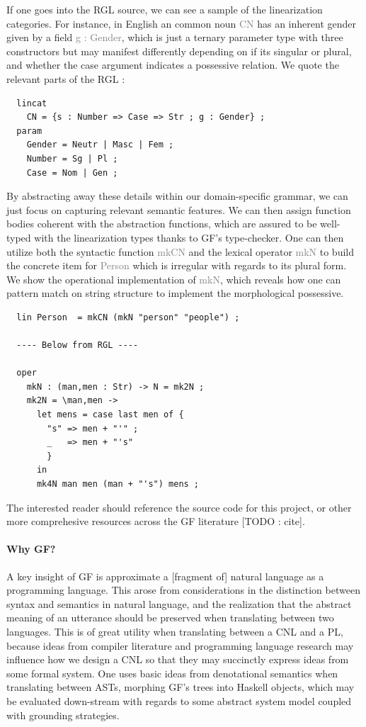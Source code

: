 \documentclass[a4paper, 11pt]{article}
\newcommand{\gray}[1]{\textcolor{gray}{#1}}
\begin{document}
If one goes into the RGL source, we can see a sample of the linearization
categories. For instance, in English an common noun \gray{CN} has an inherent
gender given by a field \gray{g : Gender}, which is just a ternary parameter
type with three constructors but may manifest differently
depending on if its singular or plural, and whether the case argument indicates
a possessive relation. We quote the relevant parts of the RGL :

\begin{verbatim}
  lincat
    CN = {s : Number => Case => Str ; g : Gender} ;
  param    
    Gender = Neutr | Masc | Fem ;
    Number = Sg | Pl ;
    Case = Nom | Gen ;
\end{verbatim}

By abstracting away these details within our domain-specific grammar, we can
just focus on capturing relevant semantic features. We can then assign function
bodies coherent with the abstraction functions, which are assured to be
well-typed with the linearization types thanks to GF's type-checker. One can
then utilize both the syntactic function \gray{mkCN} and the lexical operator
\gray{mkN} to build the concrete item for \gray{Person} which is irregular with regards
to its plural form. We show the operational implementation of \gray{mkN}, which
reveals how one can pattern match on string structure to implement the
morphological possessive.

\begin{verbatim}
  lin Person  = mkCN (mkN "person" "people") ;

  ---- Below from RGL ----

  oper
    mkN : (man,men : Str) -> N = mk2N ;
    mk2N = \man,men ->
      let mens = case last men of {
        "s" => men + "'" ;
        _   => men + "'s"
        }
      in
      mk4N man men (man + "'s") mens ;
\end{verbatim}

The interested reader should reference the source code for this project, or
other more comprehesive resources across the GF literature [TODO : cite].

\paragraph{Why GF?}

A key insight of GF is approximate a [fragment of] natural language as a
programming language. This arose from considerations in the distinction between
syntax and semantics in natural language, and the realization that the abstract
meaning of an utterance should be preserved when translating between two
languages. This is of great utility when translating between a CNL and a PL,
because ideas from compiler literature and programming language research may
influence how we design a CNL so that they may succinctly express ideas from
some formal system. One uses basic ideas from denotational semantics when
translating between ASTs, morphing GF's trees into Haskell objects, which may be
evaluated down-stream with regards to some abstract system model coupled with
grounding strategies.
\end{document}
